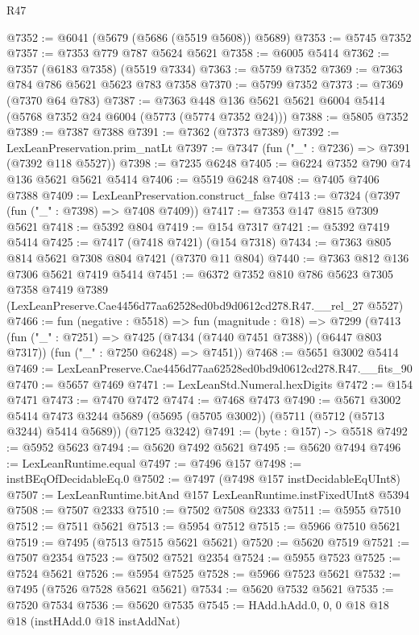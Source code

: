 \begin{lexlean}{R47}
\begin{coremodule}
@7352 := @6041 (@5679 (@5686 (@5519 @5608)) @5689)
@7353 := @5745 @7352
@7357 := @7353 @779 @787 @5624 @5621
@7358 := @6005 @5414
@7362 := @7357 (@6183 @7358) (@5519 @7334)
@7363 := @5759 @7352
@7369 := @7363 @784 @786 @5621 @5623 @783 @7358
@7370 := @5799 @7352
@7373 := @7369 (@7370 @64 @783)
@7387 := @7363 @448 @136 @5621 @5621 @6004 @5414 (@5768 @7352 @24 @6004 (@5773 (@5774 @7352 @24)))
@7388 := @5805 @7352
@7389 := @7387 @7388
@7391 := @7362 (@7373 @7389)
@7392 := LexLeanPreservation.prim_natLt
@7397 := @7347 (fun ("_" : @7236) => @7391 (@7392 @118 @5527))
@7398 := @7235 @6248
@7405 := @6224 @7352 @790 @74 @136 @5621 @5621 @5414
@7406 := @5519 @6248
@7408 := @7405 @7406 @7388
@7409 := LexLeanPreservation.construct_false
@7413 := @7324 (@7397 (fun ("_" : @7398) => @7408 @7409))
@7417 := @7353 @147 @815 @7309 @5621
@7418 := @5392 @804
@7419 := @154 @7317
@7421 := @5392 @7419 @5414
@7425 := @7417 (@7418 @7421) (@154 @7318)
@7434 := @7363 @805 @814 @5621 @7308 @804 @7421 (@7370 @11 @804)
@7440 := @7363 @812 @136 @7306 @5621 @7419 @5414
@7451 := @6372
    @7352
    @810
    @786
    @5623
    @7305
    @7358
    @7419
    @7389
    (LexLeanPreserve.Cae4456d77aa62528ed0bd9d0612cd278.R47.__rel_27 @5527)
@7466 := fun (negative : @5518) =>
  fun (magnitude : @18) =>
  @7299
    (@7413
      (fun ("_" : @7251) => @7425 (@7434 (@7440 @7451 @7388)) (@6447 @803 @7317))
      (fun ("_" : @7250 @6248) => @7451))
@7468 := @5651 @3002 @5414
@7469 := LexLeanPreserve.Cae4456d77aa62528ed0bd9d0612cd278.R47.__fits_90
@7470 := @5657 @7469
@7471 := LexLeanStd.Numeral.hexDigits
@7472 := @154 @7471
@7473 := @7470 @7472
@7474 := @7468 @7473
@7490 := @5671
    @3002
    @5414
    @7473
    @3244
    @5689
    (@5695 (@5705 @3002))
    (@5711 (@5712 (@5713 @3244) @5414 @5689))
    (@7125 @3242)
@7491 := (byte : @157) -> @5518
@7492 := @5952 @5623
@7494 := @5620 @7492 @5621
@7495 := @5620 @7494
@7496 := LexLeanRuntime.equal
@7497 := @7496 @157
@7498 := instBEqOfDecidableEq.{0}
@7502 := @7497 (@7498 @157 instDecidableEqUInt8)
@7507 := LexLeanRuntime.bitAnd @157 LexLeanRuntime.instFixedUInt8 @5394
@7508 := @7507 @2333
@7510 := @7502 @7508 @2333
@7511 := @5955 @7510
@7512 := @7511 @5621
@7513 := @5954 @7512
@7515 := @5966 @7510 @5621
@7519 := @7495 (@7513 @7515 @5621 @5621)
@7520 := @5620 @7519
@7521 := @7507 @2354
@7523 := @7502 @7521 @2354
@7524 := @5955 @7523
@7525 := @7524 @5621
@7526 := @5954 @7525
@7528 := @5966 @7523 @5621
@7532 := @7495 (@7526 @7528 @5621 @5621)
@7534 := @5620 @7532 @5621
@7535 := @7520 @7534
@7536 := @5620 @7535
@7545 := HAdd.hAdd.{0, 0, 0} @18 @18 @18 (instHAdd.{0} @18 instAddNat)

\end{coremodule}
\end{lexlean}
